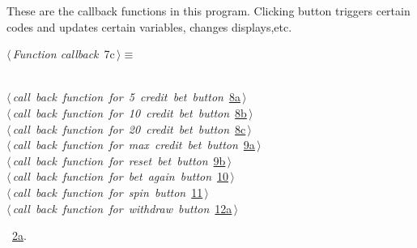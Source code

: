 \documentclass{article}
\renewcommand{\NWtarget}[2]{\hypertarget{#1}{#2}}
\renewcommand{\NWlink}[2]{\hyperlink{#1}{#2}}
\begin{document}
These are the callback functions in this program. Clicking button triggers certain codes and updates certain variables, changes displays,etc.
\begin{flushleft} \small
\begin{minipage}{\linewidth}\label{scrap9}\raggedright\small
\NWtarget{nuweb7c}{} $\langle\,${\it Function callback}\nobreak\ {\footnotesize {7c}}$\,\rangle\equiv$
\vspace{-1ex}
\begin{list}{}{} \item
\mbox{}\verb@@\\
\mbox{}\verb@@\hbox{$\langle\,${\it call back function for 5 credit bet button}\nobreak\ {\footnotesize \NWlink{nuweb8a}{8a}}$\,\rangle$}\verb@@\\
\mbox{}\verb@@\hbox{$\langle\,${\it call back function for 10 credit bet button}\nobreak\ {\footnotesize \NWlink{nuweb8b}{8b}}$\,\rangle$}\verb@@\\
\mbox{}\verb@@\hbox{$\langle\,${\it call back function for 20 credit bet button}\nobreak\ {\footnotesize \NWlink{nuweb8c}{8c}}$\,\rangle$}\verb@@\\
\mbox{}\verb@@\hbox{$\langle\,${\it call back function for max credit bet button}\nobreak\ {\footnotesize \NWlink{nuweb9a}{9a}}$\,\rangle$}\verb@@\\
\mbox{}\verb@@\hbox{$\langle\,${\it call back function for reset bet button}\nobreak\ {\footnotesize \NWlink{nuweb9b}{9b}}$\,\rangle$}\verb@@\\
\mbox{}\verb@@\hbox{$\langle\,${\it call back function for bet again button}\nobreak\ {\footnotesize \NWlink{nuweb10}{10}}$\,\rangle$}\verb@@\\
\mbox{}\verb@@\hbox{$\langle\,${\it call back function for spin button}\nobreak\ {\footnotesize \NWlink{nuweb11}{11}}$\,\rangle$}\verb@@\\
\mbox{}\verb@@\hbox{$\langle\,${\it call back function for withdraw button}\nobreak\ {\footnotesize \NWlink{nuweb12a}{12a}}$\,\rangle$}\verb@@\\
\mbox{}\verb@@{\NWsep}
\end{list}
\vspace{-1.5ex}
\footnotesize
\begin{list}{}{\setlength{\itemsep}{-\parsep}\setlength{\itemindent}{-\leftmargin}}
\item \NWtxtMacroRefIn\ \NWlink{nuweb2a}{2a}.

\item{}
\end{list}
\end{minipage}\vspace{4ex}
\end{flushleft}
\end{document}
